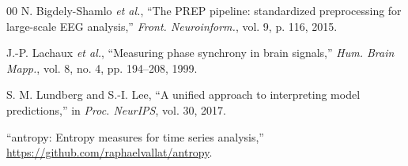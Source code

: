 \documentclass[conference]{IEEEtran}
\begin{document}
\begin{thebibliography}{00}
N. Bigdely-Shamlo \textit{et al.}, ``The PREP pipeline: standardized preprocessing for large-scale EEG analysis,'' \textit{Front. Neuroinform.}, vol. 9, p. 116, 2015.

J.-P. Lachaux \textit{et al.}, ``Measuring phase synchrony in brain signals,'' \textit{Hum. Brain Mapp.}, vol. 8, no. 4, pp. 194--208, 1999.

S. M. Lundberg and S.-I. Lee, ``A unified approach to interpreting model predictions,'' in \textit{Proc. NeurIPS}, vol. 30, 2017.

``antropy: Entropy measures for time series analysis,'' \url{https://github.com/raphaelvallat/antropy}.
\end{thebibliography}
\end{document}
